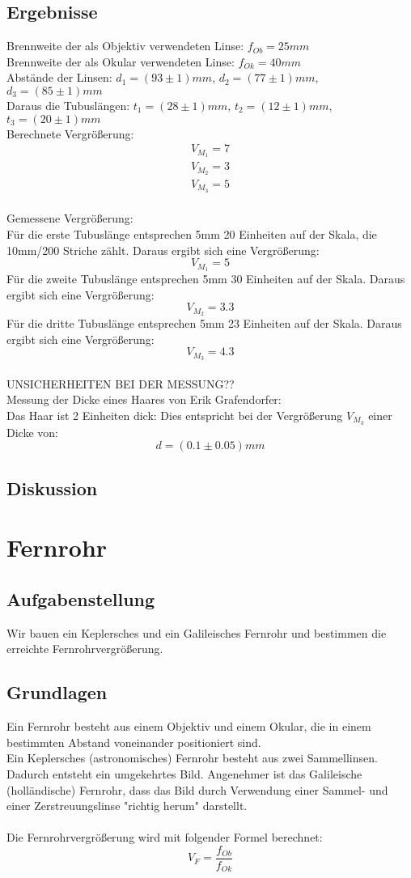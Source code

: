 \documentclass{article}
\begin{document}
\subsection{Ergebnisse}
Brennweite der als Objektiv verwendeten Linse: $f_{Ob}=25mm$\\
Brennweite der als Okular verwendeten Linse: $f_{Ok}=40mm$\\
Abstände der Linsen: $d_1=(93 \pm 1)mm$, $d_2=(77 \pm 1)mm$, $d_3=(85 \pm 1)mm$\\
Daraus die Tubuslängen: $t_1=(28 \pm 1)mm$, $t_2=(12 \pm 1)mm$, $t_3=(20 \pm 1)mm$ \\
Berechnete Vergrößerung: 
\begin{gather*}
V_{M_1}=7\\
V_{M_2}=3\\
V_{M_3}=5
\end{gather*}
\\
Gemessene Vergrößerung:\\
Für die erste Tubuslänge entsprechen 5mm 20 Einheiten auf der Skala, die 10mm/200 Striche zählt. Daraus ergibt sich eine Vergrößerung: $$\boxed{V_{M_1}=5}$$
Für die zweite Tubuslänge entsprechen 5mm 30 Einheiten auf der Skala. Daraus ergibt sich eine Vergrößerung: $$\boxed{V_{M_2}=3.3}$$
Für die dritte Tubuslänge entsprechen 5mm 23 Einheiten auf der Skala. Daraus ergibt sich eine Vergrößerung: $$\boxed{V_{M_3}=4.3}$$
\\
UNSICHERHEITEN BEI DER MESSUNG??
\\
Messung der Dicke eines Haares von Erik Grafendorfer:\\
Das Haar ist 2 Einheiten dick: Dies entspricht bei der Vergrößerung $V_{M_3}$ einer Dicke von: 
$$\boxed{d=(0.1 \pm 0.05)mm}$$
\subsection{Diskussion}

\section{Fernrohr}
\subsection{Aufgabenstellung}
Wir bauen ein Keplersches und ein Galileisches Fernrohr und bestimmen die erreichte Fernrohrvergrößerung.
\subsection{Grundlagen}
Ein Fernrohr besteht aus einem Objektiv und einem Okular, die in einem bestimmten Abstand voneinander positioniert sind.\\
Ein Keplersches (astronomisches) Fernrohr besteht aus zwei Sammellinsen. Dadurch entsteht ein umgekehrtes Bild. Angenehmer ist das Galileische (holländische) Fernrohr, dass das Bild durch Verwendung einer Sammel- und einer Zerstreuungslinse "richtig herum" darstellt.\\
\\
Die Fernrohrvergrößerung wird mit folgender Formel berechnet: 
$$V_F=\frac{f_{Ob}}{f_{Ok}}$$
\end{document}
